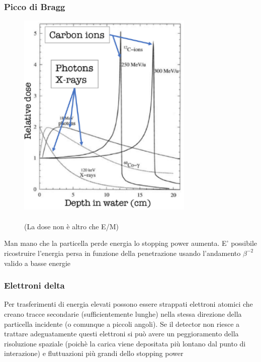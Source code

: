 \subsubsection*{Picco di Bragg}

\hspace{-20pt}
\begin{minipage}{0.55\textwidth}
    \begin{figure}[H]
        \centering
        \includegraphics[width=0.75\textwidth,frame]{Chapters/images/Interazione_radiazione_materia/image-20220214183616196.png}
        \captionsetup{width=0.75\textwidth}
        \caption{\\(La dose non è altro che E/M)}
        \label{fig:braggpeak}
    \end{figure}
\end{minipage} \hfill
\begin{minipage}{0.48\textwidth}
    Man mano che la particella perde energia lo stopping power aumenta. E' possibile ricostruire l'energia persa in funzione della penetrazione usando l'andamento $\beta^{-2}$ valido a basse energie

\subsubsection*{Elettroni delta}
Per trasferimenti di energia elevati possono essere strappati elettroni atomici che creano tracce secondarie (sufficientemente lunghe) nella stessa direzione della particella incidente (o comunque a piccoli angoli).
Se il detector non riesce a trattare adeguatamente questi elettroni si può avere un peggioramento della risoluzione spaziale (poichè la carica viene depositata più lontano dal punto di interazione) e fluttuazioni più grandi dello stopping power

\end{minipage}


